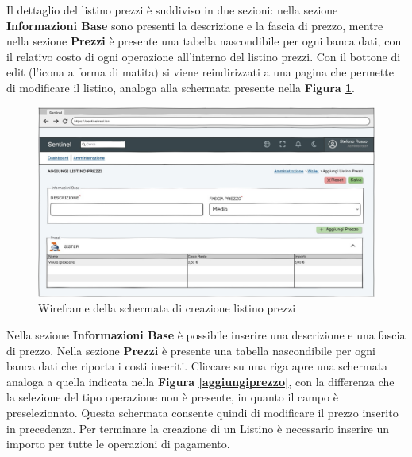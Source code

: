 Il dettaglio del listino prezzi \`e suddiviso in due sezioni: nella sezione \textbf{Informazioni Base} sono presenti la descrizione e la fascia di prezzo, mentre nella sezione
\textbf{Prezzi} \`e presente una tabella nascondibile per ogni banca dati, con il relativo costo di ogni operazione all'interno del listino prezzi.
Con il bottone di edit (l'icona a forma di matita) si viene reindirizzati a una pagina che permette di modificare il listino, analoga alla schermata presente nella \textbf{Figura \ref{aggiungilistino}}.

\begin{figure}[H]
  \centering
  \includegraphics[width=12cm]{images/gestione-listini/add-listino.png}
  \caption{Wireframe della schermata di creazione listino prezzi}
  \label{aggiungilistino}
\end{figure}
Nella sezione \textbf{Informazioni Base} \`e possibile inserire una descrizione e una fascia di prezzo.
Nella sezione \textbf{Prezzi} \`e presente una tabella nascondibile per ogni banca dati che riporta i costi inseriti.
Cliccare su una riga apre una schermata analoga a quella indicata nella \textbf{Figura \ref{aggiungiprezzo}}, con la differenza che la selezione del tipo operazione
non \`e presente, in quanto il campo \`e preselezionato. Questa schermata consente quindi di modificare il prezzo inserito in precedenza.
\label{designinserimentoprezzi}Per terminare la creazione di un Listino \`e necessario inserire un importo per tutte le operazioni di pagamento.

